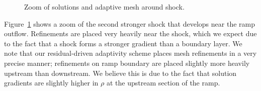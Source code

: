 \begin{figure}
\centering
{}
\caption{Zoom of solutions and adaptive mesh around shock. }
\label{fig:holdenMa6Zoom}
\end{figure}

Figure~\ref{fig:holdenMa6Zoom} shows a zoom of the second stronger shock that develops near the ramp outflow.  Refinements are placed very heavily near the shock, which we expect due to the fact that a shock forms a stronger gradient than a boundary layer.  We note that our residual-driven adaptivity scheme places mesh refinements in a very precise manner; refinements on ramp boundary are placed slightly more heavily upstream than downstream.  We believe this is due to the fact that solution gradients are slightly higher in $\rho$ at the upstream section of the ramp.  


